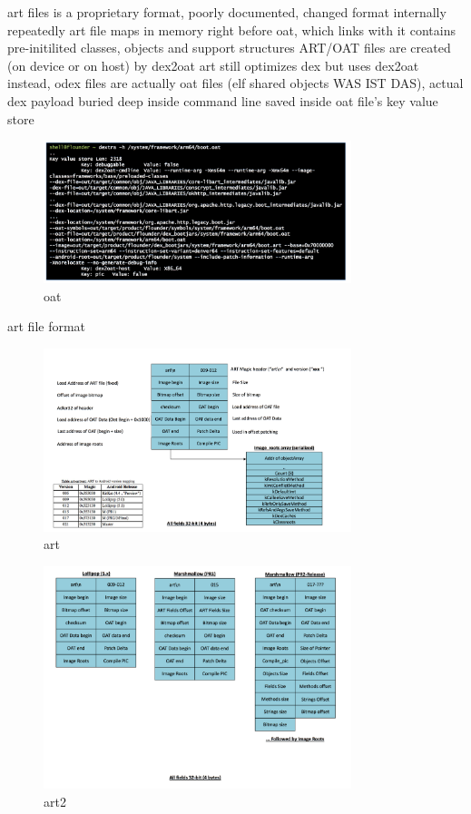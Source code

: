 art files is a proprietary format, poorly documented, changed format internally repeatedly
art file maps in memory right before oat, which links with it
contains pre-initilited classes, objects and support structures\newline
ART/OAT files are created (on device or on host) by dex2oat
art still optimizes dex but uses dex2oat instead, odex files are actually oat files (elf shared objects WAS IST DAS), actual dex payload buried deep inside
command line saved inside oat file's key value store
\begin{figure}[h]
    \centering
    \includegraphics[width=0.8\textwidth]{data/oat.png}
    \caption{oat}
    \label{fig:oat}
\end{figure}
\newline

art file format
\begin{figure}[h]
    \centering
    \includegraphics[width=0.8\textwidth]{data/art.png}
    \caption{art}
    \label{fig:art}
\end{figure}
\begin{figure}[h]
    \centering
    \includegraphics[width=0.8\textwidth]{data/art2.png}
    \caption{art2}
    \label{fig:art2}
\end{figure}

